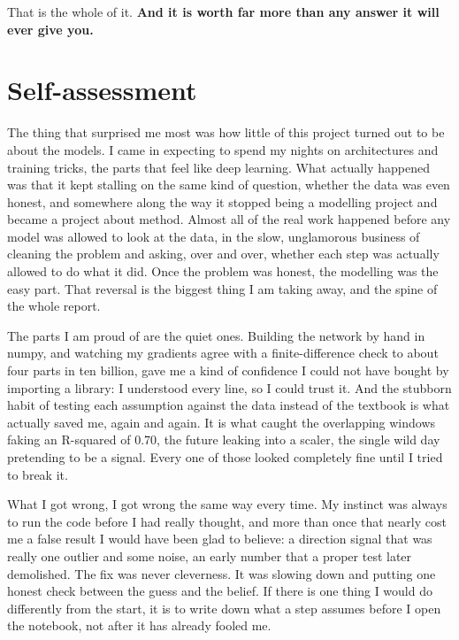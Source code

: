 \documentclass[11pt]{article} %
\begin{document}
That is the whole of it. \textbf{And it is worth far more than any answer it will ever give you.}



\section{Self-assessment}


The thing that surprised me most was how little of this project turned out to be about the models. I came in expecting to spend my nights on architectures and training tricks, the parts that feel like deep learning. What actually happened was that it kept stalling on the same kind of question, whether the data was even honest, and somewhere along the way it stopped being a modelling project and became a project about method. Almost all of the real work happened before any model was allowed to look at the data, in the slow, unglamorous business of cleaning the problem and asking, over and over, whether each step was actually allowed to do what it did. Once the problem was honest, the modelling was the easy part. That reversal is the biggest thing I am taking away, and the spine of the whole report.

The parts I am proud of are the quiet ones. Building the network by hand in numpy, and watching my gradients agree with a finite-difference check to about four parts in ten billion, gave me a kind of confidence I could not have bought by importing a library: I understood every line, so I could trust it. And the stubborn habit of testing each assumption against the data instead of the textbook is what actually saved me, again and again. It is what caught the overlapping windows faking an R-squared of 0.70, the future leaking into a scaler, the single wild day pretending to be a signal. Every one of those looked completely fine until I tried to break it.

What I got wrong, I got wrong the same way every time. My instinct was always to run the code before I had really thought, and more than once that nearly cost me a false result I would have been glad to believe: a direction signal that was really one outlier and some noise, an early number that a proper test later demolished. The fix was never cleverness. It was slowing down and putting one honest check between the guess and the belief. If there is one thing I would do differently from the start, it is to write down what a step assumes before I open the notebook, not after it has already fooled me.
\end{document}
